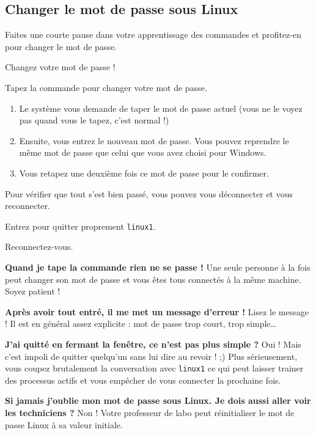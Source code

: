 \documentclass[a4paper,11pt]{style-esi/td}
\begin{document}
	\subsection{Changer le mot de passe sous Linux}

		Faites une courte pause dans votre apprentissage des commandes
		et profitez-en pour changer le mot de passe.

		\begin{Tutoriel}{Changez votre mot de passe !}
			\vspace{-1em}
			\begin{steps}
			\item Tapez la commande  pour changer votre mot de passe.
				\begin{enumerate}				
					\item 
						Le système vous demande de taper le mot de passe actuel 
						(vous ne le voyez pas quand vous le tapez, c'est normal !)
					\item 
						Ensuite, vous entrez le nouveau mot de passe.
						Vous pouvez reprendre le même mot de passe 
						que celui que vous avez choisi pour Windows.
					\item 
						Vous retapez une deuxième fois ce mot de passe pour le confirmer.
				\end{enumerate}
			\end{steps}
			Pour vérifier que tout s'est bien passé, 
			vous pouvez vous déconnecter et vous reconnecter.
			\begin{steps}
			\item Entrez  pour quitter proprement \verb_linux1_.
			\item Reconnectez-vous. 
			\end{steps}
		\end{Tutoriel}
			
		\begin{faq}
			\textbf{Quand je tape la commande rien ne se passe !}
				Une seule personne à la fois peut changer son mot de passe 
				et vous êtes tous connectés à la même machine. 
				Soyez patient !

			\medskip	
			\textbf{Après avoir tout entré, il me met un message d'erreur !}
				Lisez le message ! Il est en général assez explicite : 
				mot de passe trop court, trop simple\dots

			\medskip
			\textbf{J'ai quitté en fermant la fenêtre, ce n'est pas plus simple ?}
				Oui ! Mais c'est impoli de quitter quelqu'un sans lui dire au revoir ! ;) 
				Plus sérieusement, vous coupez brutalement la conversation avec \texttt{linux1} 
				ce qui peut laisser trainer des processus actifs et vous empêcher de vous connecter la prochaine fois.

			\medskip
			\textbf{Si jamais j'oublie mon mot de passe sous Linux. Je dois aussi aller voir les techniciens ?}			
				Non ! Votre professeur de labo peut réinitialiser le mot de passe Linux à sa valeur initiale.
		\end{faq}
\end{document}

